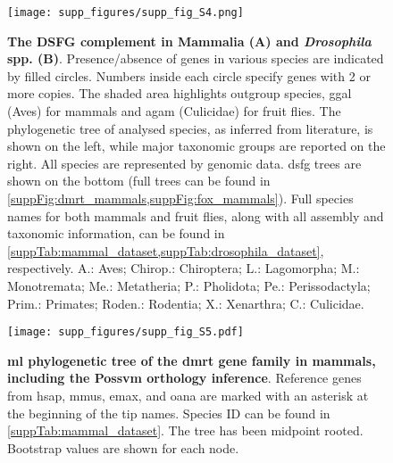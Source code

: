 \begin{figure}[ht]
	\centering
	\texttt{[image: supp\_figures/supp\_fig\_S4.png]}
	\captionsetup[subfigure]{labelformat=nocaption}
	\begin{subfigure}{0\linewidth}
		\caption{}\label{suppFig:DSFG_testCompilation-A}
	\end{subfigure}%
	\begin{subfigure}{0\linewidth}
		\caption{}\label{suppFig:DSFG_testCompilation-B}
	\end{subfigure}%
	\caption[\textbf{The DSFG complement in Mammalia and \textit{Drosophila} spp.}]
	{
		\textbf{The DSFG complement in Mammalia (A) and \textit{Drosophila} spp. (B)}. Presence/absence of genes in various species are indicated by filled circles. Numbers inside each circle specify genes with 2 or more copies. The shaded area highlights outgroup species, \gls{ggal} (Aves) for mammals and \gls{agam} (Culicidae) for fruit flies. The phylogenetic tree of analysed species, as inferred from literature, is shown on the left, while major taxonomic groups are reported on the right. All species are represented by genomic data. \gls{dsfg} trees are shown on the bottom (full trees can be found in \cref{suppFig:dmrt_mammals,suppFig:fox_mammals}). Full species names for both mammals and fruit flies, along with all assembly and taxonomic information, can be found in \cref{suppTab:mammal_dataset,suppTab:drosophila_dataset}, respectively. A.: Aves; Chirop.: Chiroptera; L.: Lagomorpha; M.: Monotremata; Me.: Metatheria; P.: Pholidota; Pe.: Perissodactyla; Prim.: Primates; Roden.: Rodentia; X.: Xenarthra; C.: Culicidae.
	}
	\label{suppFig:DSFG_testCompilation}
\end{figure}

\begin{figure}[ht]
	\centering
	\texttt{[image: supp\_figures/supp\_fig\_S5.pdf]}
	\caption[\textbf{\gls{ml} phylogenetic tree of the \gls{dmrt} gene family in mammals, including the Possvm orthology inference}]
	{
		\textbf{\gls{ml} phylogenetic tree of the \gls{dmrt} gene family in mammals, including the Possvm orthology inference}. Reference genes from \gls{hsap}, \gls{mmus}, \gls{emax}, and \gls{oana} are marked with an asterisk at the beginning of the tip names. Species ID can be found in \cref{suppTab:mammal_dataset}. The tree has been midpoint rooted. Bootstrap values are shown for each node.
	}
	\label{suppFig:dmrt_mammals}
\end{figure}

